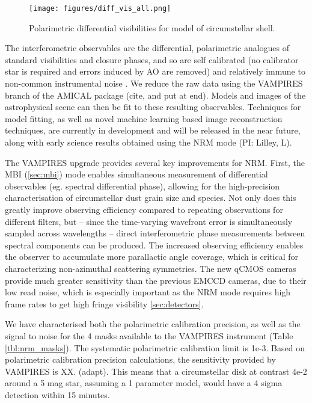 \begin{figure}[h]
\centering
    \texttt{[image: figures/diff\_vis\_all.png]}
    \caption{Polarimetric differential visibilities for model of circumstellar shell. \label{fig:diff_vis_all}}
\end{figure}

The interferometric observables are the differential, polarimetric analogues of standard visibilities and closure phases, and so are self calibrated (no calibrator star is required and errors induced by AO are removed) and relatively immune to non-common instrumental noise \citep{norris_vampires_2015}. We reduce the raw data using the VAMPIRES branch of the AMICAL package (cite, and put at end). Models and images of the astrophysical scene can then be fit to these resulting observables. Techniques for model fitting, as well as novel machine learning based image reconstruction techniques, are currently in development and will be released in the near future, along with early science results obtained using the NRM mode (PI: Lilley, L). 
 
The VAMPIRES upgrade provides several key improvements for NRM. First, the MBI (\autoref{sec:mbi}) mode enables simultaneous measurement of differential observables (eg. spectral differential phase), allowing for the high-precision characterisation of circumstellar dust grain size and species. Not only does this greatly improve observing efficiency compared to repeating observations for different filters, but -- since the time-varying wavefront error is simultaneously sampled across wavelengths -- direct interferometric phase measurements between spectral components can be produced. 
The increased observing efficiency enables the observer to accumulate more parallactic angle coverage, which is critical for characterizing non-azimuthal scattering symmetries. The new qCMOS cameras provide much greater sensitivity than the previous EMCCD cameras, due to their low read noise, which is especially important as the NRM mode requires high frame rates to get high fringe visibility \autoref{sec:detectors}.  
 
We have characterised both the polarimetric calibration precision, as well as the signal to noise for the 4 masks available to the VAMPIRES instrument (Table \ref{tbl:nrm_masks}). The systematic polarimetric calibration limit is 1e-3. Based on polarimetric calibration precision calculations, the sensitivity provided by VAMPIRES is XX. (adapt). This means that a circumstellar disk at contrast 4e-2 around a 5 mag star, assuming a 1 parameter model, would have a 4 sigma detection within 15 minutes. 

